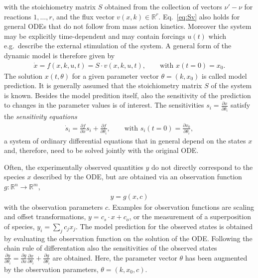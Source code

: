 \documentclass[article]{jss}
\begin{document}
with the stoichiometry matrix $S$
obtained from the collection of vectors $\nu' - \nu$ for reactions $1, \dots, r$,
and the flux vector $v(x,k)\in\mathbb R^{r}$.
Eq.~\eqref{eq:Sv} also holds for general ODEs that do not follow from mass action kinetics. Moreover the system may be explicitly time-dependent and may contain forcings $u(t)$ which e.g.~describe the external stimulation of the system. A general form of the dynamic model is therefore given by
\begin{align}
	\dot x = f(x,k,u,t) = S \cdot v(x,k,u,t), \quad\quad \textrm{with }  x(t = 0) = x_0.
\end{align}
The solution $x(t,\theta)$ for a given parameter vector $\theta = (k, x_0)$ is called model prediction. %
It is generally assumed that the stoichiometry matrix $S$ of the system is known.
Besides the model predition itself, also the sensitivity of the prediction to changes in the parameter values is of interest.
The sensitivities $s_i = \frac{\partial x}{\partial \theta_i}$ satisfy the \textit{sensitivity equations}
\begin{align}
	\dot s_i  = \frac{\partial f}{\partial x} s_i + \frac{\partial f}{\partial \theta_i}, \qquad \textrm{with }s_i(t = 0) = \frac{\partial x_0}{\partial \theta_i},
\end{align}
a system of ordinary differential equations that in general depend on the states $x$ and, therefore, need to be solved jointly with the original ODE.

Often, the experimentally observed quantities $y$ do not directly correspond to the species $x$ described by the ODE, but are obtained via an observation function $g: \mathbb{R}^n \rightarrow \mathbb{R}^m$,  \begin{align}
	y = g(x, c)
	\label{eq:observation}
\end{align}
with the observation parameters $c$. Examples for observation functions are scaling and offset transformations, $y = c_s \cdot x + c_o$, or the measurement of a superposition of species, $y_i = \sum_j c_j x_j$. The model prediction for the observed states is obtained by evaluating the observation function on the solution of the ODE. Following the chain rule of differentation also the sensitivities of the observed states $\frac{\partial y}{\partial \theta_i} = \frac{\partial g}{\partial x} \frac{\partial x}{\partial\theta_i}  + \frac{\partial g}{\partial \theta_i}$ are obtained. Here, the parameter vector $\theta$ has been augmented by the observation parameters, $\theta = (k, x_0, c)$.
\end{document}
